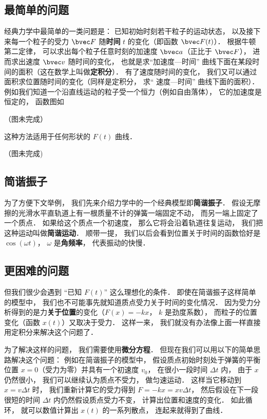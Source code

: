\subsection{最简单的问题}
经典力学中最简单的一类问题是： 已知初始时刻若干粒子的运动状态， 以及接下来每一个粒子的受力 $\bvec F$ 随\textbf{时间} $t$ 的变化（即函数 $\bvec F(t)$）． 根据牛顿第二定律， 可以求出每个粒子任意时刻的加速度 $\bvec a$（正比于 $\bvec F$）， 进而求出速度 $\bvec v$ 随时间的变化， 也就是求“加速度—时间” 曲线下面在某段时间的面积（这在数学上叫做\textbf{定积分}）． 有了速度随时间的变化， 我们又可以通过面积求位置随时间的变化（同样是定积分， 求“ 速度—时间” 曲线下面的面积）． 例如我们知道一个沿直线运动的粒子受一个恒力（例如自由落体）， 它的加速度是恒定的， 函数图如

（图未完成）%

这种方法适用于任何形状的 $F(t)$ 曲线．

（图未完成) %

\subsection{简谐振子}
为了方便下文举例， 我们先来介绍力学中的一个经典模型即\textbf{简谐振子}． 假设无摩擦的光滑水平直轨道上有一根质量不计的弹簧一端固定不动， 而另一端上固定了一个质点． 如果给这个质点一个初速度， 那么它将会沿着轨道往复运动， 我们把这种运动叫做\textbf{简谐运动}． 顺带一提， 我们以后会看到位置关于时间的函数恰好是 $\cos(\omega t)$， $\omega$ 是\textbf{角频率}， 代表振动的快慢．

\subsection{更困难的问题}
但我们很少会遇到 “已知 $F(t)$” 这么理想化的条件． 即使在简谐振子这样简单的模型中， 我们也不可能事先就知道质点受力关于时间的变化情况． 因为受力分析得到的是力\textbf{关于位置}的变化（$F(x) = -k x$， $k$ 是劲度系数）， 而粒子的位置变化（函数 $x(t)$）又取决于受力． 这样一来， 我们就没有办法像上面一样直接用定积分来解决这个问题了．

为了解决这样的问题， 我们需要使用\textbf{微分方程}． 但现在我们可以用以下的简单思路解决这个问题： 例如在简谐振子的模型中， 假设质点初始时刻处于弹簧的平衡位置 $x = 0$（受力为零）并具有一个初速度 $v_0$， 在很小一段时间 $\Delta t$ 内， 由于 $x$ 仍然很小， 我们可以继续认为质点不受力， 做匀速运动． 这样当它移动到 $x = v\Delta t$ 时， 我们重新计算它的受力得到 $F = -kx = x v \Delta t$， 然后假设在下一段很短的时间 $\Delta t$ 内仍然假设质点受力不变， 计算出位置和速度的变化． 如此循环， 就可以数值计算出 $x(t)$ 的一系列散点， 连起来就得到了曲线．

